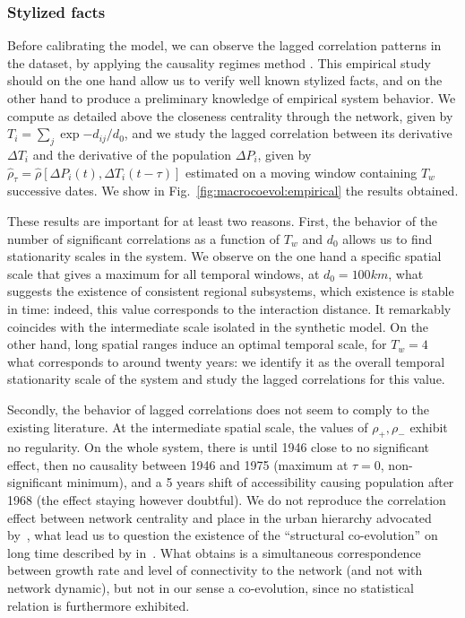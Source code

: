 

\subsubsection{Stylized facts}


Before calibrating the model, we can observe the lagged correlation patterns in the dataset, by applying the causality regimes method \citep{raimbault2017identification}. This empirical study should on the one hand allow us to verify well known stylized facts, and on the other hand to produce a preliminary knowledge of empirical system behavior. We compute as detailed above the closeness centrality through the network, given by $T_i = \sum_j \exp{-d_{ij}/d_0}$, and we study the lagged correlation between its derivative $\Delta T_i$ and the derivative of the population $\Delta P_i$, given by $\hat{\rho}_{\tau} = \hat{\rho}\left[\Delta P_i(t),\Delta T_i(t-\tau)\right]$ estimated on a moving window containing $T_w$ successive dates. We show in Fig.~\ref{fig:macrocoevol:empirical} the results obtained.


These results are important for at least two reasons. First, the behavior of the number of significant correlations as a function of $T_w$ and $d_0$ allows us to find stationarity scales in the system. We observe on the one hand a specific spatial scale that gives a maximum for all temporal windows, at $d_0 = 100km$, what suggests the existence of consistent regional subsystems, which existence is stable in time: indeed, this value corresponds to the interaction distance. It remarkably coincides with the intermediate scale isolated in the synthetic model. On the other hand, long spatial ranges induce an optimal temporal scale, for $T_w = 4$ what corresponds to around twenty years: we identify it as the overall temporal stationarity scale of the system and study the lagged correlations for this value.



Secondly, the behavior of lagged correlations does not seem to comply to the existing literature. At the intermediate spatial scale, the values of $\rho_+,\rho_-$ exhibit no regularity. On the whole system, there is until 1946 close to no significant effect, then no causality between 1946 and 1975 (maximum at $\tau = 0$, non-significant minimum), and a 5 years shift of accessibility causing population after 1968 (the effect staying however doubtful). We do not reproduce the correlation effect between network centrality and place in the urban hierarchy advocated by~\cite{bretagnolle2003vitesse}, what lead us to question the existence of the ``structural co-evolution'' on long time described by  in~\citep{espacegeo2014effets}. What \cite{bretagnolle2003vitesse} obtains is a simultaneous correspondence between growth rate and level of connectivity to the network (and not with network dynamic), but not in our sense a co-evolution, since no statistical relation is furthermore exhibited.

